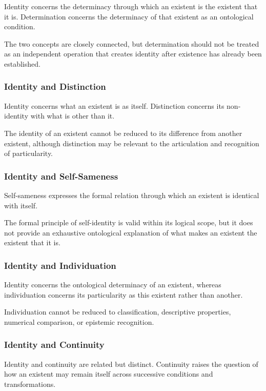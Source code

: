 Identity concerns the determinacy through which an existent is the existent that it is. Determination concerns the determinacy of that existent as an ontological condition.

The two concepts are closely connected, but determination should not be treated as an independent operation that creates identity after existence has already been established.

\subsubsection{Identity and Distinction}

Identity concerns what an existent is as itself. Distinction concerns its non-identity with what is other than it.

The identity of an existent cannot be reduced to its difference from another existent, although distinction may be relevant to the articulation and recognition of particularity.

\subsubsection{Identity and Self-Sameness}

Self-sameness expresses the formal relation through which an existent is identical with itself.

The formal principle of self-identity is valid within its logical scope, but it does not provide an exhaustive ontological explanation of what makes an existent the existent that it is.

\subsubsection{Identity and Individuation}

Identity concerns the ontological determinacy of an existent, whereas individuation concerns its particularity as this existent rather than another.

Individuation cannot be reduced to classification, descriptive properties, numerical comparison, or epistemic recognition.

\subsubsection{Identity and Continuity}

Identity and continuity are related but distinct. Continuity raises the question of how an existent may remain itself across successive conditions and transformations.


